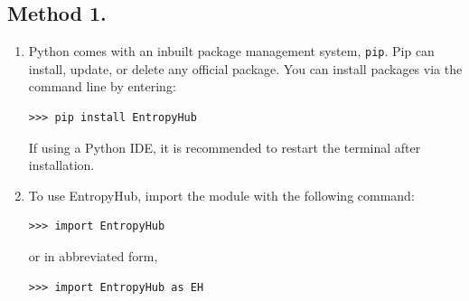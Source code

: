 \documentclass[12pt, a4paper, titlepage, openany]{book}
\begin{document}
\subsection*{\normalsize Method 1.}
\begin{enumerate}	
\item Python comes with an inbuilt package management system, \texttt{pip}. Pip can install, update, or delete any official package. You can install packages via the command line by entering:
\begin{verbatim}
>>> pip install EntropyHub	
\end{verbatim}
If using a Python IDE, it is recommended to restart the terminal after installation.

\item To use EntropyHub, import the module with the following command:
\begin{verbatim}
>>> import EntropyHub
\end{verbatim}
or in abbreviated form,
\begin{verbatim}
>>> import EntropyHub as EH
\end{verbatim}
\end{enumerate}
\end{document}
